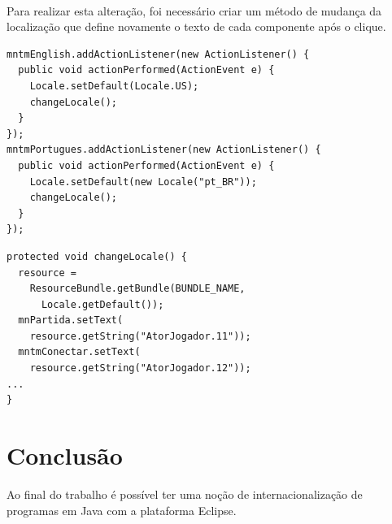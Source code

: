 \documentclass[a4paper, 12pt]{article}
\begin{document}
\FloatBarrier
\paragraph{} Para realizar esta alteração, foi necessário criar um
método de mudança da localização que define novamente o texto de cada
componente após o clique.

\begin{lstlisting}[frame=single, caption={Clique no Menu de Linguagem},
  captionpos=b]
mntmEnglish.addActionListener(new ActionListener() {
  public void actionPerformed(ActionEvent e) {
    Locale.setDefault(Locale.US);
    changeLocale();
  }
});
mntmPortugues.addActionListener(new ActionListener() {
  public void actionPerformed(ActionEvent e) {
    Locale.setDefault(new Locale("pt_BR"));
    changeLocale();
  }
});
\end{lstlisting}

\begin{lstlisting}[frame=single, caption={Método de definição das
    novas \emph{Strings}}, captionpos=b]
protected void changeLocale() {
  resource = 
    ResourceBundle.getBundle(BUNDLE_NAME,
      Locale.getDefault());
  mnPartida.setText(
    resource.getString("AtorJogador.11"));
  mntmConectar.setText(
    resource.getString("AtorJogador.12"));
...
}
\end{lstlisting}

\section{Conclusão} \label{results}

Ao final do trabalho é possível ter uma noção de internacionalização
de programas em Java com a plataforma Eclipse.
\end{document}
